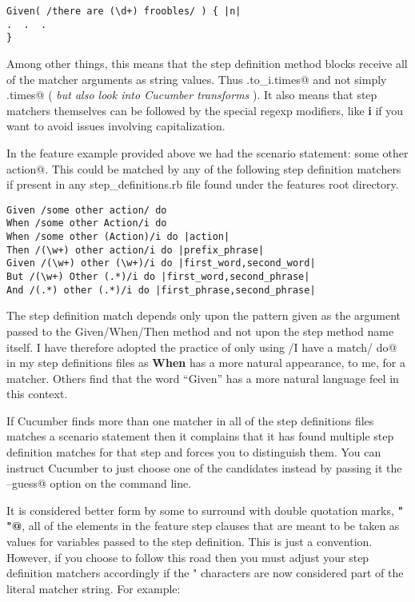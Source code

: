 \documentclass[10pt]{book}
\begin{document}
\begin{verbatim}
Given( /there are (\d+) froobles/ ) { |n|
.  .  .
}
\end{verbatim}
Among other things, this means that the step definition method blocks receive all of the matcher arguments as string values.  Thus \verb@n.to_i.times@ and not simply \verb@n.times@ ( \emph{but also look into Cucumber transforms} ).  It also means that step matchers themselves can be followed by the special regexp modifiers, like \textbf{i} if you want to avoid issues involving capitalization.

In the feature example provided above we had the scenario statement: \verb@And some other action@.  This could be matched by any of the following step definition matchers if present in any step\_definitions.rb file found under the features root directory.
\begin{verbatim}
Given /some other action/ do
When /some other Action/i do 
When /some other (Action)/i do |action|
Then /(\w+) other action/i do |prefix_phrase|
Given /(\w+) other (\w+)/i do |first_word,second_word|
But /(\w+) Other (.*)/i do |first_word,second_phrase|
And /(.*) other (.*)/i do |first_phrase,second_phrase|

\end{verbatim}

The step definition match depends only upon the pattern given as the argument passed to the Given/When/Then method and not upon the step method name itself.  I have therefore adopted the practice of only using \verb@When /I have a match/ do@ in my step definitions files as \textbf{When} has a more natural appearance, to me, for a matcher.  Others find that the word ``Given'' has a more natural language feel in this context.

If Cucumber finds more than one matcher in all of the step definitions files matches a scenario statement then it complains that it has found multiple step definition matches for that step and forces you to distinguish them.  You can instruct Cucumber to just choose one of the candidates instead by passing it the \verb@--guess@ option on the command line.

It is considered better form by some to surround with double quotation marks, \textbf{\verb@" "@}, all of the elements in the feature step clauses that are meant to be taken as values for variables passed to the step definition. This is just a convention.  However, if you choose to follow this road then you must adjust your step definition matchers accordingly if the " characters are now considered part of the literal matcher string.  For example:
\end{document}
